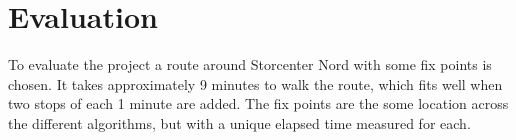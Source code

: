 \section{Evaluation}
To evaluate the project a route around Storcenter Nord with some fix points is chosen. It takes approximately 9 minutes to walk the route, which fits well when two stops of each 1 minute are added. The fix points are the some location across the different algorithms, but with a unique elapsed time measured for each.





